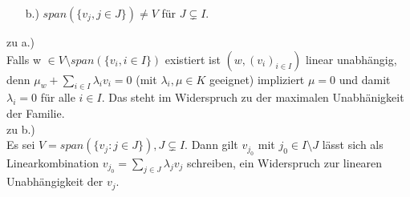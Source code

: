 \documentclass{scrartcl}
\newcommand{\lb}{\lambda}
\begin{document}
\begin{itemize}
{\begin{itemize}
\item[b.)]{\(span(\{v_j, j \in J\}) \neq V\) f\"ur \(J \subsetneq I\).}
\end{itemize}
zu a.)\\
Falls w  \(\in V \setminus span(\{v_i, i \in I\})\) existiert ist \((w, (v_i)_{i \in I})\) linear unabh\"angig, denn \(\mu_w + \sum_{i \in I} \lb_i v_i = 0\) (mit \(\lb_i, \mu \in K\) geeignet) impliziert \(\mu = 0\) und damit \(\lb_i = 0\) f\"ur alle \(i \in I\). Das steht im Widerspruch zu der maximalen Unabh\"anigkeit der Familie.\\
zu b.)\\
Es sei \(V = span(\{v_j : j \in J\}), J \subsetneq I\). Dann gilt \(v_{j_0}\) mit \(j_0 \in I \setminus J\) l\"asst sich als Linearkombination \(v_{j_0} = \sum_{j \in J} \lb_j v_j\) schreiben, ein Widerspruch zur linearen Unabh\"angigkeit der \(v_j\).
}
\end{itemize}
\end{document}
